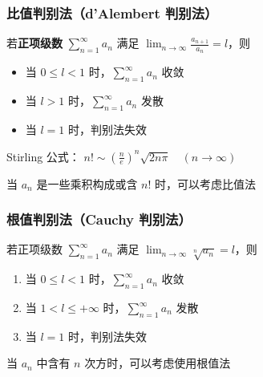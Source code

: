 \documentclass[lang = zh , final , oneside , openany , titlepage , zihao = -4 , linespread = 1.3 , baselineskip = false , cjk-font = windows , text-font = newtx , math-font = newtx]{sjtureport}
\begin{document}
\subsubsection{比值判别法（d'Alembert 判别法）}

\begin{theorem}
    若\textbf{正项级数} \(\displaystyle \sum_{n=1}^\infty a_n\) 满足
\(\displaystyle \lim_{n\to\infty} \frac{a_{n+1}}{a_n} = l\)，则

\begin{itemize}
\item
  当 \(0\leq l<1\) 时，\(\displaystyle \sum_{n=1}^\infty a_n\) 收敛
\item
  当 \(l>1\) 时，\(\displaystyle \sum_{n=1}^\infty a_n\) 发散
\item
  当 \(l=1\) 时，判别法失效
\end{itemize}
\end{theorem}

\begin{remark}
    Stirling 公式：
\(n! \sim \left(\frac{n}{e}\right)^n \sqrt{2n\pi} \quad (n\to\infty)\)
\end{remark}

\begin{remark}
    当 \(a_n\) 是一些乘积构成或含 \(n!\) 时，可以考虑比值法
\end{remark}

\subsubsection{根值判别法（Cauchy 判别法）}

\begin{theorem}
若正项级数 \(\displaystyle \sum_{n=1}^\infty a_n\) 满足
\(\displaystyle \lim_{n\to\infty} \sqrt[n]{a_n} = l\)，则

\begin{enumerate}
\def\labelenumi{\arabic{enumi}.}
\item
  当 \(0\leq l<1\) 时，\(\displaystyle \sum_{n=1}^\infty a_n\) 收敛
\item
  当 \(1 < l \leq +\infty\) 时，\(\displaystyle \sum_{n=1}^\infty a_n\)
  发散
\item
  当 \(l=1\) 时，判别法失效
\end{enumerate}
\end{theorem}

\begin{remark}
    当 \(a_n\) 中含有 \(n\) 次方时，可以考虑使用根值法
\end{remark}
\end{document}
